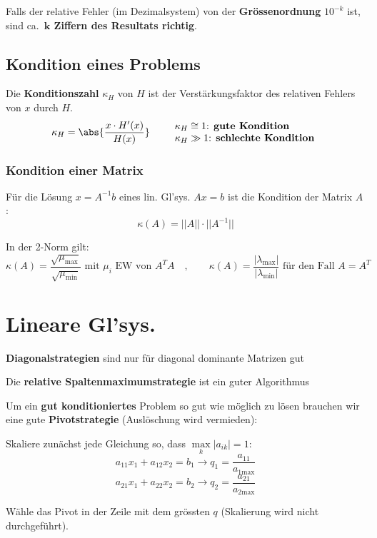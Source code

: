 			Falls der relative Fehler (im Dezimalsystem) von der \textbf{Grössenordnung} $10^{-k}$ ist, sind ca.~\textbf{$\boldsymbol k$ Ziffern des Resultats richtig}. 
			
	\subsection{Kondition eines Problems}
		Die \textbf{Konditionszahl} $\kappa_H$ von $H$ ist der Verstärkungsfaktor des relativen Fehlers von $x$ durch $H$.
		\[
			\kappa_H = \abs{\frac{x\cdot H'(x)}{H(x)}}
			\qquad
			\begin{array}{l}
				\kappa_H \cong 1 \text{: \textbf{gute Kondition}} \\
				\kappa_H \gg 1 \text{: \textbf{schlechte Kondition}}
			\end{array}
		\]

	\subsubsection{Kondition einer Matrix}
		Für die Lösung $x= A^{-1}b$ eines lin. Gl'sys. $Ax = b$ ist die Kondition der Matrix $A$:
		\[
			\kappa (A) = ||A||\cdot ||A^{-1}||
		\]
		
		In der 2-Norm gilt:
		\[
			\kappa(A) = \frac{\sqrt{\mu_\text{max}}}{\sqrt{\mu_\text{min}}} \text{ mit } \mu_i \text{ EW von }A^T A
			\quad,\qquad
			\kappa(A) = \frac{|\lambda_\text{max}|}{|\lambda_\text{min}|} \text{ für den Fall } A=A^T
		\]
		
\section{Lineare Gl'sys.} 
	\begin{tightenumerate}
		\item \textbf{Diagonalstrategien} sind nur für diagonal dominante Matrizen gut
		\item Die \textbf{relative Spaltenmaximumstrategie} ist ein guter Algorithmus 
	\end{tightenumerate}
	
	Um ein \textbf{gut konditioniertes} Problem so gut wie möglich zu lösen brauchen wir eine gute \textbf{Pivotstrategie} (Auslöschung wird vermieden):
	\begin{tightenumerate}
		\item Skaliere zunächst jede Gleichung so, dass $\underset{k}{\max}|a_{ik}| = 1$:
		\[ a_{11}x_1 + a_{12}x_2 = b_1 \rightarrow q_1 = \frac{a_{11}}{a_{1\text{max}}}\]
		\[ a_{21}x_1 + a_{22}x_2 = b_2 \rightarrow q_2 = \frac{a_{21}}{a_{2\text{max}}}\]
		\item Wähle das Pivot in der Zeile mit dem grössten $q$ (Skalierung wird nicht durchgeführt).
	\end{tightenumerate}
	
